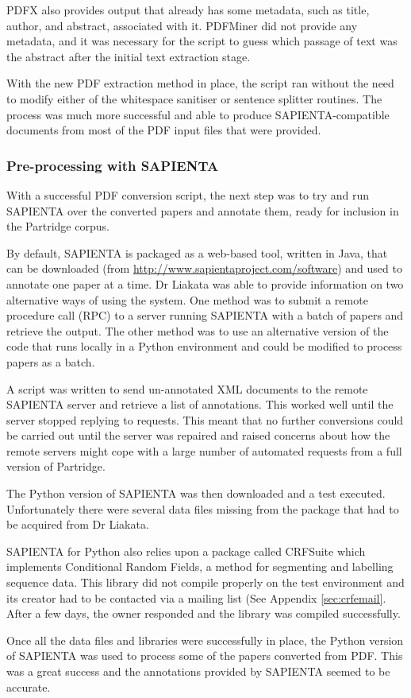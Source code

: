 PDFX also provides output that already has some metadata, such as title,
author, and abstract, associated with it. PDFMiner did not provide any
metadata, and it was necessary for the script to guess which passage of text
was the abstract after the initial text extraction stage.

With the new PDF extraction method in place, the script ran without the need
to modify either of the whitespace sanitiser or sentence splitter routines. The
process was much more successful and able to produce SAPIENTA-compatible
documents from most of the PDF input files that were provided.

\subsubsection{Pre-processing with SAPIENTA}

With a successful PDF conversion script, the next step was to try and run
SAPIENTA over the converted papers and annotate them, ready for inclusion in
the Partridge corpus.

By default, SAPIENTA is packaged as a web-based tool, written in Java, that
can be downloaded (from \url{http://www.sapientaproject.com/software}) and used
to annotate one paper at a time. Dr Liakata was able to provide information on
two alternative ways of using the system. One method was to submit a remote
procedure call (RPC) to a server running SAPIENTA with a batch of papers and
retrieve the output. The other method was to use an alternative version of the
code that runs locally in a Python environment and could be modified to process
papers as a batch.

A script was written to send un-annotated XML documents to the remote SAPIENTA
server and retrieve a list of annotations. This worked well until the server
stopped replying to requests. This meant that no further conversions could be
carried out until the server was repaired and raised concerns about how the
remote servers might cope with a large number of automated requests from a
full version of Partridge.

The Python version of SAPIENTA was then downloaded and a test executed.
Unfortunately there were several data files missing from the package that had
to be acquired from Dr Liakata. 

SAPIENTA for Python also relies upon a package called CRFSuite which implements
Conditional Random Fields, a method for segmenting and labelling sequence
data\cite{CRFsuite}. This library did not compile properly on the test
environment and its creator had to be contacted via a mailing list (See
Appendix \ref{sec:crfemail}. After a few days, the owner responded and the
library was compiled successfully.  

Once all the data files and libraries were successfully in place, the Python
version of SAPIENTA was used to process some of the papers converted from PDF.
This was a great success and the annotations provided by SAPIENTA seemed to be
accurate. 



